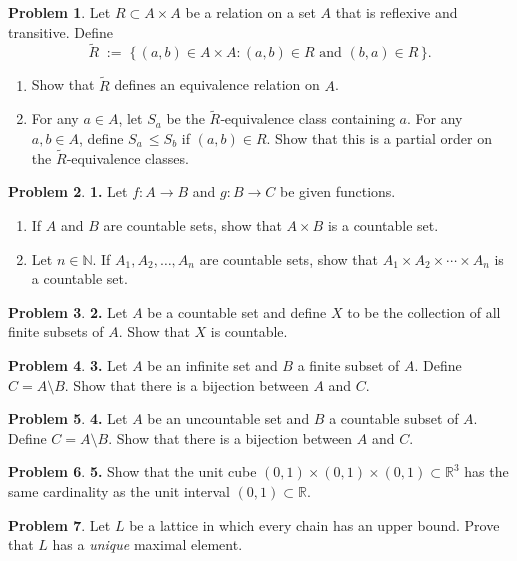 \documentclass[10pt]{article}
\theoremstyle{definition} %
\newtheorem{problem}{Problem}
\theoremstyle{plain} %
\begin{document}
\begin{problem}
  Let $R \subset A \times A$ be a relation on a set $A$ that is reflexive and transitive.
  Define
  \[
      \widetilde{R}
      \;:=\;
      \{\, (a,b) \in A \times A : (a,b) \in R \text{ and } (b,a) \in R \,\}.
  \]
  \begin{enumerate}[label=(\alph*)]
      \item Show that $\widetilde{R}$ defines an equivalence relation on $A$.
      \item For any $a \in A$, let $S_a$ be the $\widetilde{R}$‑equivalence class containing $a$.
            For any $a,b \in A$, define $S_a \,\le S_b$ if $(a,b) \in R$.
            Show that this is a partial order on the $\widetilde{R}$‑equivalence classes.
  \end{enumerate}
\end{problem}
\begin{problem}
  \textbf{1.} Let \(f:A\to B\) and \(g:B\to C\) be given functions.
  \begin{enumerate}[label=(\alph*)]
    \item If \(A\) and \(B\) are countable sets, show that \(A\times B\) is a countable set.
    \item Let \(n\in\mathbb{N}\).  If \(A_{1},A_{2},\dots,A_{n}\) are countable sets, show that
          \(A_{1}\times A_{2}\times\cdots\times A_{n}\) is a countable set.
  \end{enumerate}
  \end{problem}
  
  \begin{problem}
  \textbf{2.} Let \(A\) be a countable set and define \(X\) to be the collection of all finite subsets of \(A\).
  Show that \(X\) is countable.
  \end{problem}
  
  \begin{problem}
  \textbf{3.} Let \(A\) be an infinite set and \(B\) a finite subset of \(A\).
  Define \(C=A\setminus B\).  Show that there is a bijection between \(A\) and \(C\).
  \end{problem}
  
  \begin{problem}
  \textbf{4.} Let \(A\) be an uncountable set and \(B\) a countable subset of \(A\).
  Define \(C=A\setminus B\).  Show that there is a bijection between \(A\) and \(C\).
  \end{problem}
  
  \begin{problem}
  \textbf{5.} Show that the unit cube \((0,1)\times(0,1)\times(0,1)\subset\mathbb{R}^{3}\)
  has the same cardinality as the unit interval \((0,1)\subset\mathbb{R}\).
  \end{problem}
\begin{problem}
  Let $L$ be a lattice in which every chain has an upper bound.  
  Prove that $L$ has a \emph{unique} maximal element.
\end{problem}
\end{document}
